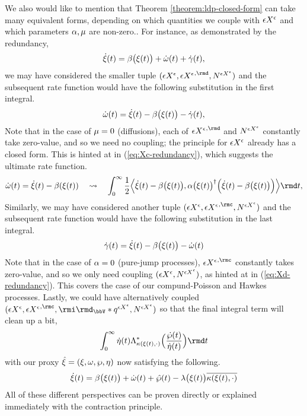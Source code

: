 We also would like to mention that Theorem \ref{theorem:ldp-closed-form} can take many equivalent forms, depending on which quantities we couple with $\epsilon X^\epsilon$ and which parameters $\alpha, \mu$ are non-zero..
For instance, as demonstrated by the redundancy,
\[
  \dot{\xi}(t) = \beta\big(\xi(t)\big) + \dot\omega(t) + \dot\gamma(t),
\]
we may have considered the smaller tuple $(\Xe, {\Xe}^{,\rmd}, \N^{\Xe})$ and the subsequent rate function would have the following substitution in the first integral.
\begin{equation}
  \label{eq:Xc-redundancy}
  \dot\omega(t) = \dot{\xi}(t) - \beta\big(\xi(t)\big) - \dot\gamma(t),
\end{equation}
Note that in the case of $\mu=0$ (diffusions), each of ${\Xe}^{,\rmd}$ and $N^{\epsilon X^\epsilon}$ constantly take zero-value, and so we need no coupling; the principle for $\epsilon X^\epsilon$ already has a closed form.
This is hinted at in (\ref{eq:Xc-redundancy}), which suggests the ultimate rate function.
\[
  \dot\omega(t) =\dot\pathVar(t) - \affDrift(\pathVar(t)) \quad\leadsto\quad \int_0^\infty \frac12 \Bprj{\dot\pathVar(t)-\affDrift\big(\pathVar(t)\big)}{\affDiff\big(\pathVar(t)\big)^\dagger \Big(\dot\pathVar(t)-\affDrift\big(\pathVar(t)\big)\Big)} \rmd t,
\]
Similarly, we may have considered another tuple $(\Xe, {\Xe}^{,\rmc}, \N^{\Xe})$ and the subsequent rate function would have the following substitution in the last integral.
\begin{equation}
  \label{eq:Xd-redundancy}
  \dot\gamma(t) = \dot{\xi}(t) - \beta\big(\xi(t)\big) - \dot\omega(t)
\end{equation}
Note that in the case of $\alpha=0$ (pure-jump processes), ${\Xe}^{,\rmc}$ constantly takes zero-value, and so we only need coupling $(\epsilon X^\epsilon, N^{\epsilon X^\epsilon})$, as hinted at in (\ref{eq:Xd-redundancy}).
This covers the case of our compund-Poisson and Hawkes processes.
Lastly, we could have alternatively coupled $(\Xe, {\Xe}^{,\rmc}, \id_\vecSpace \ast \jumpMeas^{\Xe}, \N^{\Xe})$ so that the final integral term will clean up a bit,
\begin{equation*}
  \int_0^\infty \dot\eta(t) \ode_{\affDist(\pathVar(t),\cdot)}^*\Big(\frac{\dot\wp(t)}{\dot\eta(t)}\Big) \rmd t
\end{equation*}
with our proxy $\hat{\xi} = (\xi, \omega, \wp, \eta)$ now satisfying the following.
\[
  \dot{\xi}(t) = \beta\big(\xi(t)\big) + \dot\omega(t) + \hat\wp(t) - \lambda\big(\xi(t)\big) \overline{\kappa(\xi(t), \cdot)}
\]
All of these different perspectives can be proven directly or explained immediately with the contraction principle.
